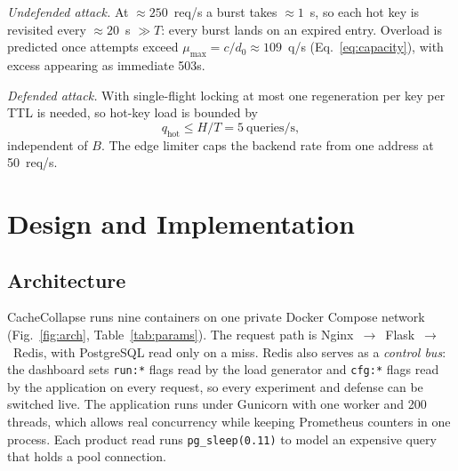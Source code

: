 \documentclass[journal]{IEEEtran}
\begin{document}
\emph{Undefended attack.} At ${\approx}250$~req/s a burst takes ${\approx}1$~s, so each
hot key is revisited every ${\approx}20$~s $\gg T$: every burst lands on an expired
entry. Overload is predicted once attempts exceed $\mu_{\max}=c/d_0\approx109$~q/s
(Eq.~\ref{eq:capacity}), with excess appearing as immediate 503s.

\emph{Defended attack.} With single-flight locking at most one regeneration per key per
TTL is needed, so hot-key load is bounded by
\begin{equation}
q_{\mathrm{hot}} \le H/T = 5~\text{queries/s},
\label{eq:defended}
\end{equation}
independent of $B$. The edge limiter caps the backend rate from one address at
50~req/s.

\section{Design and Implementation}
\label{sec:design}

\subsection{Architecture}
CacheCollapse runs nine containers on one private Docker Compose network
 (Fig.~\ref{fig:arch}, Table~\ref{tab:params}). The request path is
Nginx~$\rightarrow$~Flask~$\rightarrow$~Redis, with PostgreSQL read only on a miss.
Redis also serves as a \emph{control bus}: the dashboard sets \texttt{run:*} flags read
by the load generator and \texttt{cfg:*} flags read by the application on every
request, so every experiment and defense can be switched live. The application runs
under Gunicorn with one worker and 200 threads, which allows real concurrency while
keeping Prometheus counters in one process. Each product read runs
\texttt{pg\_sleep(0.11)} to model an expensive query that holds a pool connection.
\end{document}
